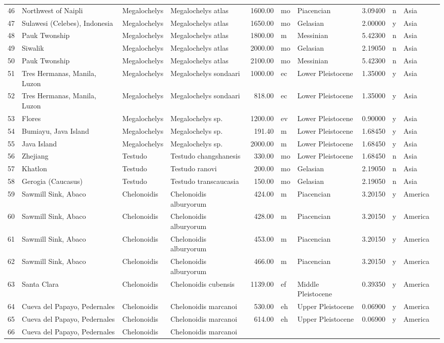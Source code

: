 \begin{landscape}
{\begin{longtable}[]{@{}llllrllrlll@{}}
	46 & Northwest of Naipli & Megalochelys & Megalochelys atlas & 1600.00 &
	mo & Piacencian & 3.09400 & n & Asia\tabularnewline
	47 & Sulawesi (Celebes), Indonesia & Megalochelys & Megalochelys atlas &
	1650.00 & mo & Gelasian & 2.00000 & y & Asia\tabularnewline
	48 & Pauk Twonship & Megalochelys & Megalochelys atlas & 1800.00 & m &
	Messinian & 5.42300 & n & Asia\tabularnewline
	49 & Siwalik & Megalochelys & Megalochelys atlas & 2000.00 & mo &
	Gelasian & 2.19050 & n & Asia\tabularnewline
	50 & Pauk Twonship & Megalochelys & Megalochelys atlas & 2100.00 & mo &
	Messinian & 5.42300 & n & Asia\tabularnewline
	51 & Tres Hermanas, Manila, Luzon & Megalochelys & Megalochelys sondaari
	& 1000.00 & ec & Lower Pleistocene & 1.35000 & y & Asia\tabularnewline
	52 & Tres Hermanas, Manila, Luzon & Megalochelys & Megalochelys sondaari
	& 818.00 & ec & Lower Pleistocene & 1.35000 & y & Asia\tabularnewline
	53 & Flores & Megalochelys & Megalochelys sp. & 1200.00 & ev & Lower
	Pleistocene & 0.90000 & y & Asia\tabularnewline
	54 & Bumiayu, Java Island & Megalochelys & Megalochelys sp. & 191.40 & m
	& Lower Pleistocene & 1.68450 & y & Asia\tabularnewline
	55 & Java Island & Megalochelys & Megalochelys sp. & 2000.00 & m & Lower
	Pleistocene & 1.68450 & y & Asia\tabularnewline
	56 & Zhejiang & Testudo & Testudo changshanesis & 330.00 & mo & Lower
	Pleistocene & 1.68450 & n & Asia\tabularnewline
	57 & Khatlon & Testudo & Testudo ranovi & 200.00 & mo & Gelasian &
	2.19050 & n & Asia\tabularnewline
	58 & Gerogia (Caucasus) & Testudo & Testudo transcaucasia & 150.00 & mo
	& Gelasian & 2.19050 & n & Asia\tabularnewline
	59 & Sawmill Sink, Abaco & Chelonoidis & Chelonoidis alburyorum & 424.00
	& m & Piacencian & 3.20150 & y & America\tabularnewline
	60 & Sawmill Sink, Abaco & Chelonoidis & Chelonoidis alburyorum & 428.00
	& m & Piacencian & 3.20150 & y & America\tabularnewline
	61 & Sawmill Sink, Abaco & Chelonoidis & Chelonoidis alburyorum & 453.00
	& m & Piacencian & 3.20150 & y & America\tabularnewline
	62 & Sawmill Sink, Abaco & Chelonoidis & Chelonoidis alburyorum & 466.00
	& m & Piacencian & 3.20150 & y & America\tabularnewline
	63 & Santa Clara & Chelonoidis & Chelonoidis cubensis & 1139.00 & ef &
	Middle Pleistocene & 0.39350 & y & America\tabularnewline
	64 & Cueva del Papayo, Pedernales & Chelonoidis & Chelonoidis marcanoi &
	530.00 & eh & Upper Pleistocene & 0.06900 & y & America\tabularnewline
	65 & Cueva del Papayo, Pedernales & Chelonoidis & Chelonoidis marcanoi &
	614.00 & eh & Upper Pleistocene & 0.06900 & y & America\tabularnewline
	66 & Cueva del Papayo, Pedernales & Chelonoidis & Chelonoidis marcanoi &

\end{longtable}}
\end{landscape}
